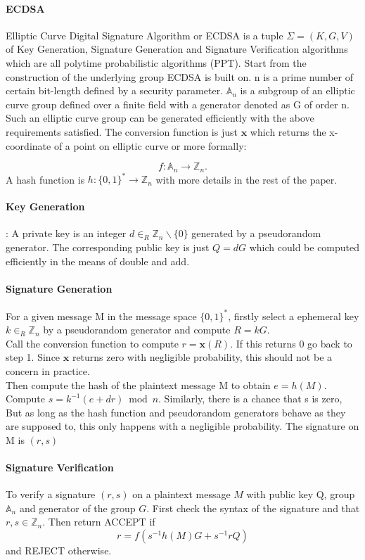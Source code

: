 \documentclass[18]{article}
\begin{document}
\paragraph{ECDSA}
Elliptic Curve Digital Signature Algorithm or ECDSA is a tuple $\Sigma=(K,G,V)$ of Key Generation, Signature Generation and Signature Verification algorithms which are all polytime probabilistic algorithms (PPT).
Start from the construction of the underlying group ECDSA is built on.
n is a prime number of certain bit-length defined by a security parameter.
$\mathbb{A}_n$ is a subgroup of an elliptic curve group defined over a finite field with a generator denoted as G of order n.
Such an elliptic curve group can be generated efficiently with the above requirements satisfied.
The conversion function is just $\mathbf{x}$ which returns the x-coordinate of a point on elliptic curve or more formally:

\begin{equation*}
f: \mathbb{A}_n \to \mathbb{Z}_n.
\end{equation*}
A hash function is $h:\{0,1\}^* \to \mathbb{Z}_n$ with more details in the rest of the paper.\\
\paragraph{Key Generation}: A private key is an integer $d\in _R \mathbb{Z}_n \backslash \{0\}$ generated by a pseudorandom generator.
The corresponding public key is just $Q=dG$ which could be computed efficiently in the means of double and add.
\paragraph{Signature Generation}
For a given message M in the message space $\{0,1\}^*$, firstly select a ephemeral key $k\in_R \mathbb{Z}_n$ by a pseudorandom generator and compute $R=kG$. \\
Call the conversion function to compute $r=\mathbf{x}(R)$. If this returns 0 go back to step 1. Since $\mathbf{x}$ returns zero with negligible probability, this should not be a concern in practice.\\
Then compute the hash of the plaintext message M to obtain $e=h(M)$. Compute $s=k^{-1}(e+dr) \bmod n$. Similarly, there is a chance that s is zero, But as long as the hash function and pseudorandom generators behave as they are supposed to,
this only happens with a negligible probability. The signature on M is $(r,s)$
\paragraph{Signature Verification}
To verify a signature $(r,s)$ on a plaintext message $M$ with public key Q, group $\mathbb{A}_n$ and generator of the group $G$. First check the syntax of the signature and that $r,s \in \mathbb{Z}_n$. Then return ACCEPT if
\begin{equation*}
r=f(s^{-1}h(M)G+s^{-1}rQ)
\end{equation*}
and REJECT otherwise.
\end{document}
